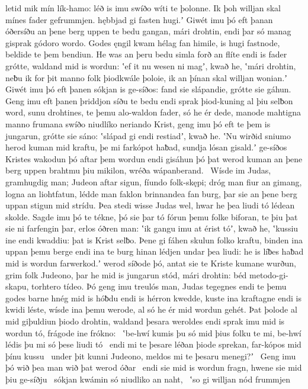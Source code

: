 letid mik mín lík-hamo: léð is imu swíðo
wíti te þolonne. Ik þoh willjan skal
mínes fader gefrummjen. hębbjad gi fasten hugi.ʼ
Giwét imu þó eft þanan óðersíðu
an þene berg uppen te bedu gangan,
mári drohtin, endi þar só manag gisprak
gódoro wordo. Godes ęngil kwam
hélag fan himile, is hugi fastnode,
beldide te þem bendiun. He was an þeru bedu simla
forð an flíte endi is fader grótte,
waldand mid is wordun: ʽef it nu wesen ni magʼ, kwað he,
ʽmári drohtin, neƀu ik for þit manno folk
þiodkwále þoloie, ik an þínan skal
willjan wonian.ʼ Giwét imu þó eft þanen
sókjan is ge-síðos: fand sie slápandie,
grótte sie gáhun. Geng imu eft þanen
þriddjon síðu te bedu endi sprak þiod-kuning
al þiu selƀon word, sunu drohtines,
te þemu alo-waldon fader, só he ér dede,
manode mahtigna manno frumana
swíðo niudlíko neriando Krist,
geng imu þó eft te þem is jungarun, grótte sie sáno:
ʽslápad gi endi restiadʼ, kwað he. ʽNu wirðid sniumo herod
kuman mid kraftu, þe mi farkópot haƀad,
sundja lósan gisald.ʼ ge-síðos Kristes
wakodun þó aftar þem wordun endi gisáhun þó þat werod kuman
an þene berg uppen brahtmu þiu mikilon,
wréða wápanberand. \hld\ Wísde im Judas,
gramhugdig man; Judeon aftar sigun,
fíundo folk-skępi; dróg man fiur an gimang,
logna an liohtfatun, lédde man faklon
brinnandea fan burg, þar sie an þene berg uppan
stigun mid strídu. Þea stedi wisse Judas wel,
hwar he þea liudi tó lédean skolde.
Sagde imu þó te tékne, þó sie þar tó fórun
þemu folke biforan, te þiu þat sie ni farfengin þar,
erlos óðren man: ʽik gangu imu at érist tóʼ, kwað he,
ʽkussiu ine endi kwaddiu: þat is Krist selƀo.
Þene gi fáhen skulun folko kraftu,
binden ina uppan þemu berge endi ina te burg hinan
lédjen undar þea liudi: he is líƀes haƀad
mid is wordun farwerkod.ʼ werod síðode þó,
antat sie te Kriste kumane wurðun,
grim folk Judeono, þar he mid is jungarun stód,
mári drohtin: béd metodo-gi-skapu,
torhtero tídeo. Þó geng imu treulós man,
Judas tegegnes endi te þemu godes barne
hnég mid is hóƀdu endi is hérron kwedde,
kuste ina kraftagne endi is kwidi léste,
wísde ina þemu werode, al só he ér mid wordun gehét.
Þat þolode al mid giþuldiun þiodo drohtin,
waldand þesara weroldes endi sprak imu mid is wordun tó,
frágode ine frókno: \hld\ ʽbe-hwí kumis þu só mid þius folku te mi,
be-hwí lédis þu mi só þese liudi tó \hld\ endi mi te þesare léðan þiode sprekan,
far-kópos mid þínu kussu \hld\ under þit kunni Judeono,
meldos mi te þesaru menegi?ʼ \hld\ Geng imu þó wið þea man
wið þat werod óðar \hld\ endi sie mid is wordun fragn,
hwene sie mid þiu ge-síðju \hld\ sókjan kwámin
só niudliko an naht, \hld\ ʽso gi willjan nód frummjen

